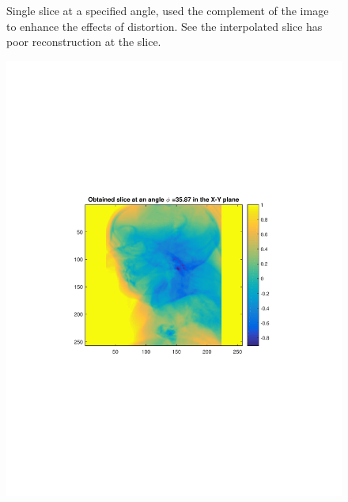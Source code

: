 \documentclass{UCF_ETD}
\begin{document}
\begin{figure}[H]
\begin{center}
\caption{Single slice at a specified angle, used the complement of the image to enhance the effects of distortion. See the interpolated slice has poor reconstruction at the slice.}
\label{SliceofVolumetricData.fig}
\end{center}
\end{figure}


\begin{figure}[H]   
\begin{center}
\includegraphics[scale=0.5]{FVR/ExactSliceColor}

\end{center}
\end{figure}
\end{document}
